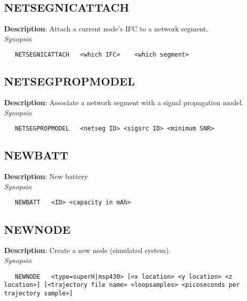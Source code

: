 \subsection{\bf NETSEGNICATTACH}
\label{manpages:NETSEGNICATTACH}
\label{manpages:netsegnicattach}
\vspace{-0.2in}
{\bf Description}: 	Attach a current node's IFC to a network segment.\\[1.5ex]
{\em Synopsis}:
\vspace{-0.2in}
\scriptsize
\begin{verbatim}
   NETSEGNICATTACH   <which IFC>	<which segment>	
\end{verbatim}
\normalsize
\vspace{-0.2in}


\subsection{\bf NETSEGPROPMODEL}
\label{manpages:NETSEGPROPMODEL}
\label{manpages:netsegpropmodel}
\vspace{-0.2in}
{\bf Description}: 	Associate a network segment with a signal propagation model.\\[1.5ex]
{\em Synopsis}:
\vspace{-0.2in}
\scriptsize
\begin{verbatim}
   NETSEGPROPMODEL   <netseg ID> <sigsrc ID> <minimum SNR>	
\end{verbatim}
\normalsize
\vspace{-0.2in}


\subsection{\bf NEWBATT}
\label{manpages:NEWBATT}
\label{manpages:newbatt}
\vspace{-0.2in}
{\bf Description}: 	New battery\\[1.5ex]
{\em Synopsis}:
\vspace{-0.2in}
\scriptsize
\begin{verbatim}
   NEWBATT   <ID> <capacity in mAh>					
\end{verbatim}
\normalsize
\vspace{-0.2in}


\subsection{\bf NEWNODE}
\label{manpages:NEWNODE}
\label{manpages:newnode}
\vspace{-0.2in}
{\bf Description}: 	Create a new node (simulated system).\\[1.5ex]
{\em Synopsis}:
\vspace{-0.2in}
\scriptsize
\begin{verbatim}
   NEWNODE   <type=superH|msp430> [<x location> <y location> <z location>] [<trajectory file name> <loopsamples> <picoseconds per trajectory sample>]	
\end{verbatim}
\normalsize
\vspace{-0.2in}


